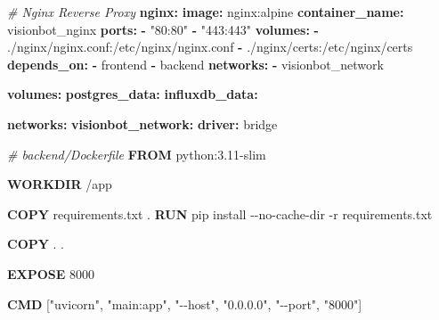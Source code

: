 \documentclass[
]{article}
\newenvironment{Shaded}{\begin{snugshade}}{\end{snugshade}}
\newcommand{\AttributeTok}[1]{\textcolor[rgb]{0.13,0.29,0.53}{#1}}
\newcommand{\CommentTok}[1]{\textcolor[rgb]{0.56,0.35,0.01}{\textit{#1}}}
\newcommand{\ExtensionTok}[1]{#1}
\newcommand{\FunctionTok}[1]{\textcolor[rgb]{0.13,0.29,0.53}{\textbf{#1}}}
\newcommand{\KeywordTok}[1]{\textcolor[rgb]{0.13,0.29,0.53}{\textbf{#1}}}
\newcommand{\NormalTok}[1]{#1}
\newcommand{\StringTok}[1]{\textcolor[rgb]{0.31,0.60,0.02}{#1}}
\begin{document}
\begin{Shaded}
\begin{Highlighting}[]
\CommentTok{  \# Nginx Reverse Proxy}
\AttributeTok{  }\FunctionTok{nginx}\KeywordTok{:}
\AttributeTok{    }\FunctionTok{image}\KeywordTok{:}\AttributeTok{ nginx:alpine}
\AttributeTok{    }\FunctionTok{container\_name}\KeywordTok{:}\AttributeTok{ visionbot\_nginx}
\AttributeTok{    }\FunctionTok{ports}\KeywordTok{:}
\AttributeTok{      }\KeywordTok{{-}}\AttributeTok{ }\StringTok{"80:80"}
\AttributeTok{      }\KeywordTok{{-}}\AttributeTok{ }\StringTok{"443:443"}
\AttributeTok{    }\FunctionTok{volumes}\KeywordTok{:}
\AttributeTok{      }\KeywordTok{{-}}\AttributeTok{ ./nginx/nginx.conf:/etc/nginx/nginx.conf}
\AttributeTok{      }\KeywordTok{{-}}\AttributeTok{ ./nginx/certs:/etc/nginx/certs}
\AttributeTok{    }\FunctionTok{depends\_on}\KeywordTok{:}
\AttributeTok{      }\KeywordTok{{-}}\AttributeTok{ frontend}
\AttributeTok{      }\KeywordTok{{-}}\AttributeTok{ backend}
\AttributeTok{    }\FunctionTok{networks}\KeywordTok{:}
\AttributeTok{      }\KeywordTok{{-}}\AttributeTok{ visionbot\_network}

\FunctionTok{volumes}\KeywordTok{:}
\AttributeTok{  }\FunctionTok{postgres\_data}\KeywordTok{:}
\AttributeTok{  }\FunctionTok{influxdb\_data}\KeywordTok{:}

\FunctionTok{networks}\KeywordTok{:}
\AttributeTok{  }\FunctionTok{visionbot\_network}\KeywordTok{:}
\AttributeTok{    }\FunctionTok{driver}\KeywordTok{:}\AttributeTok{ bridge}
\end{Highlighting}
\end{Shaded}

\begin{Shaded}
\begin{Highlighting}[]
\CommentTok{\# backend/Dockerfile}
\KeywordTok{FROM}\NormalTok{ python:3.11{-}slim}

\KeywordTok{WORKDIR}\NormalTok{ /app}

\KeywordTok{COPY}\NormalTok{ requirements.txt .}
\KeywordTok{RUN} \ExtensionTok{pip}\NormalTok{ install }\AttributeTok{{-}{-}no{-}cache{-}dir} \AttributeTok{{-}r}\NormalTok{ requirements.txt}

\KeywordTok{COPY}\NormalTok{ . .}

\KeywordTok{EXPOSE}\NormalTok{ 8000}

\KeywordTok{CMD}\NormalTok{ [}\StringTok{"uvicorn"}\NormalTok{, }\StringTok{"main:app"}\NormalTok{, }\StringTok{"{-}{-}host"}\NormalTok{, }\StringTok{"0.0.0.0"}\NormalTok{, }\StringTok{"{-}{-}port"}\NormalTok{, }\StringTok{"8000"}\NormalTok{]}
\end{Highlighting}
\end{Shaded}
\end{document}
